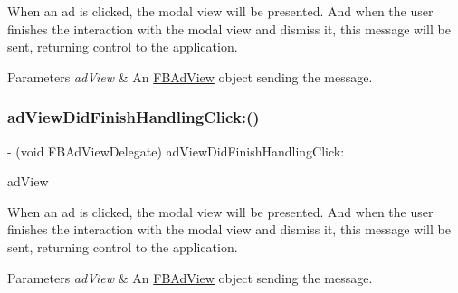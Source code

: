 When an ad is clicked, the modal view will be presented. And when the user finishes the interaction with the modal view and dismiss it, this message will be sent, returning control to the application.


\begin{DoxyParams}{Parameters}
{\em ad\+View} & An \hyperlink{interfaceFBAdView}{F\+B\+Ad\+View} object sending the message. \\
\hline
\end{DoxyParams}
\mbox{\label{protocolFBAdViewDelegate_01-p_a7fb041c26e7163226dfc7f2565c543b6}} 
\subsubsection{\texorpdfstring{ad\+View\+Did\+Finish\+Handling\+Click\+:()}{adViewDidFinishHandlingClick:()}\hspace{0.1cm}{\footnotesize\ttfamily [5/5]}}
{\footnotesize\ttfamily -\/ (void F\+B\+Ad\+View\+Delegate) ad\+View\+Did\+Finish\+Handling\+Click\+: \begin{DoxyParamCaption}\item[{(\hyperlink{interfaceFBAdView}{F\+B\+Ad\+View} $\ast$)}]{ad\+View }\end{DoxyParamCaption}\hspace{0.3cm}{\ttfamily [optional]}}

When an ad is clicked, the modal view will be presented. And when the user finishes the interaction with the modal view and dismiss it, this message will be sent, returning control to the application.


\begin{DoxyParams}{Parameters}
{\em ad\+View} & An \hyperlink{interfaceFBAdView}{F\+B\+Ad\+View} object sending the message. \\
\hline
\end{DoxyParams}
\mbox{\label{protocolFBAdViewDelegate_01-p_a77334fc3e7bcc1f4ed61e1fbd372359a}} 
